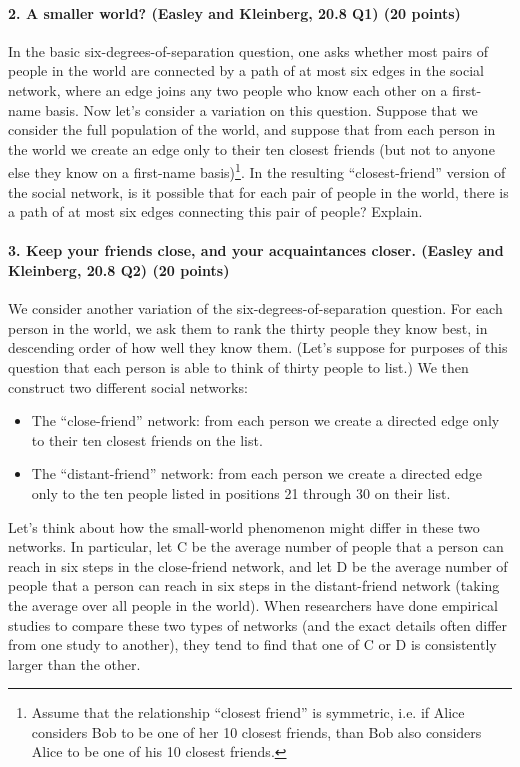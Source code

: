 \documentclass[11pt]{article} %
\begin{document}
\paragraph{2. A smaller world? (Easley and Kleinberg, 20.8 Q1) (20 points)}  In the basic six-degrees-of-separation question, one asks whether most pairs of people
in the world are connected by a path of at most six edges in the social network, where
an edge joins any two people who know each other on a first-name basis.
Now let's consider a variation on this question. Suppose that we consider the full
population of the world, and suppose that from each person in the world we create
an edge only to their ten closest friends (but not to anyone else they know on
a first-name basis)\footnote{Assume that the relationship ``closest friend'' is symmetric, i.e. if Alice considers Bob to be one of her 10 closest friends, than Bob also considers Alice to be one of his 10 closest friends.}. In the resulting ``closest-friend'' version of the social network, is it
possible that for each pair of people in the world, there is a path of at most six edges
connecting this pair of people? Explain.

\paragraph{3. Keep your friends close, and your acquaintances closer. (Easley and Kleinberg, 20.8 Q2) (20 points)}  We consider another variation of the six-degrees-of-separation question. For each person in the world, we
ask them to rank the thirty people they know best, in descending order of how well
they know them. (Let's suppose for purposes of this question that each person is able
to think of thirty people to list.) We then construct two different social networks:
\begin{itemize}
\item The ``close-friend'' network: from each person we create a directed edge
only to their ten closest friends on the list.
\item The ``distant-friend'' network: from each person we create a directed edge
only to the ten people listed in positions 21 through 30 on their list.
\end{itemize}
Let's think about how the small-world phenomenon might differ in these two networks.
In particular, let C be the average number of people that a person can reach
in six steps in the close-friend network, and let D be the average number of people
that a person can reach in six steps in the distant-friend network (taking the average
over all people in the world).
When researchers have done empirical studies to compare these two types of
networks (and the exact details often differ from one study to another), they tend
to find that one of C or D is consistently larger than the other.
\end{document}
